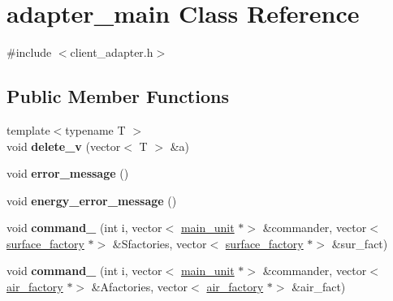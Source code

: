 \hypertarget{classadapter__main}{}\section{adapter\+\_\+main Class Reference}
\label{classadapter__main}


{\ttfamily \#include $<$client\+\_\+adapter.\+h$>$}

\subsection*{Public Member Functions}
\begin{DoxyCompactItemize}
\item 
\mbox{\label{classadapter__main_a318dc38638b55e1d4c9b37191dacdd4c}} 
{\footnotesize template$<$typename T $>$ }\\void {\bfseries delete\+\_\+v} (vector$<$ T $>$ \&a)
\item 
\mbox{\label{classadapter__main_af2f800b621961b7da3a1fcb14e7c2e84}} 
void {\bfseries error\+\_\+message} ()
\item 
\mbox{\label{classadapter__main_a46ab4b20ebfc35f0e044303c8e6f8194}} 
void {\bfseries energy\+\_\+error\+\_\+message} ()
\item 
\mbox{\label{classadapter__main_a2bb11de0901dafbe32cb8ceb89a3b51c}} 
void {\bfseries command\+\_} (int i, vector$<$ \mbox{\hyperlink{classmain__unit}{main\+\_\+unit}} $\ast$$>$ \&commander, vector$<$ \mbox{\hyperlink{classsurface__factory}{surface\+\_\+factory}} $\ast$$>$ \&Sfactories, vector$<$ \mbox{\hyperlink{classsurface__factory}{surface\+\_\+factory}} $\ast$$>$ \&sur\+\_\+fact)
\item 
\mbox{\label{classadapter__main_ae21a5f2e7ebf60a3b38a189171f8e7de}} 
void {\bfseries command\+\_} (int i, vector$<$ \mbox{\hyperlink{classmain__unit}{main\+\_\+unit}} $\ast$$>$ \&commander, vector$<$ \mbox{\hyperlink{classair__factory}{air\+\_\+factory}} $\ast$$>$ \&Afactories, vector$<$ \mbox{\hyperlink{classair__factory}{air\+\_\+factory}} $\ast$$>$ \&air\+\_\+fact)
\item 
\mbox{\label{classadapter__main_a29b834262a397edb16c6d924279e4c48}} 

\end{DoxyCompactItemize}
